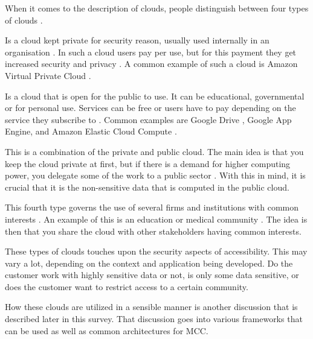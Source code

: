 When it comes to the description of clouds, people distinguish between four types of clouds \citep{article:mobilecloudreviewinderkilde,article:mobilecloudreviewinderkildesecurity}.
\begin{description} [style=nextline]
\item[Private Cloud]
	Is a cloud kept private for security reason, usually used internally in an organisation \citep{article:mobilecloudreviewinderkildesecurity}.
	In such a cloud users pay per use, but for this payment they get increased security and privacy \citep{article:mobilecloudreviewinderkilde}.
	A common example of such a cloud is Amazon Virtual Private Cloud \citep{article:mobilecloudreviewinderkilde}.
\item[Public Cloud]
	Is a cloud that is open for the public to use. It can be educational, governmental or for personal use. Services can be free or users have to pay depending on the service they subscribe to \citep{article:mobilecloudreviewinderkilde}.
	Common examples are Google Drive \citep{article:mobilecloudreviewinderkildesecurity}, Google App Engine, and Amazon Elastic Cloud Compute \citep{article:mobilecloudreviewinderkilde}. 
\item[Hybrid Cloud]
	This is a combination of the private and public cloud.
	The main idea is that you keep the cloud private at first, but if there is a demand for higher computing power, you delegate some of the work to a public sector \citep{article:mobilecloudreviewinderkilde}. With this in mind, it is crucial that it is the non-sensitive data that is computed in the public cloud.
\item[Community Cloud]
	This fourth type governs the use of several firms and institutions with common interests \citep{article:mobilecloudreviewinderkilde}.
	An example of this is an education or medical community \citep{article:mobilecloudreviewinderkildesecurity}.
	The idea is then that you share the cloud with other stakeholders having common interests.
\end{description}
These types of clouds touches upon the security aspects of accessibility.
This may vary a lot, depending on the context and application being developed.
Do the customer work with highly sensitive data or not, is only some data sensitive, or does the customer want to restrict access to a certain community.

How these clouds are utilized in a sensible manner is another discussion that is described later in this survey. That discussion goes into various frameworks that can be used as well as common architectures for MCC.
